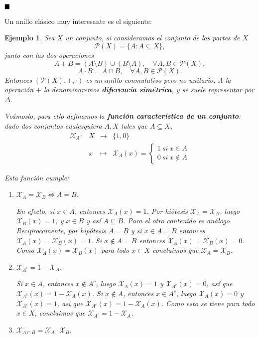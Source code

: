 \documentclass[12pt]{article}
\newtheorem{example}{Ejemplo}[theorem]
\begin{document}
$\hfill \blacksquare$

Un anillo clásico muy interesante es el siguiente:

\begin{example}Sea $X$ un conjunto, si consideramos el conjunto de las partes de $X$ $$\mathcal{P}(X) = \lbrace A : A \subseteq X \rbrace,$$ junto con las dos operaciones $$A+B = (A \setminus B) \cup (B \setminus A), \quad \forall A,B \in \mathcal{P}(X),$$ $$A \cdot B = A \cap B, \quad \forall A,B \in \mathcal{P}(X).$$ Entonces $(\mathcal{P}(X), +, \cdot)$ es un anillo conmutativo pero no unitario. A la operación $+$ la denominaremos \textbf{diferencia simétrica}, y se suele representar por $\Delta$.

Veámoslo, para ello definamos la \textbf{función característica de un conjunto}: dado dos conjuntos cualesquiera $A,X$ tales que $A \subseteq X$, 
$$\begin{array}{rccl}
\mathcal{X}_A \colon &X&\longrightarrow &\lbrace 1, 0\rbrace \\
&x& \longmapsto &\mathcal{X}_A(x) = \left\lbrace\begin{array}{c} 1~si~x \in A \\ 0~si~x \notin A \end{array}\right.
\end{array}
$$

Esta función cumple: 
\begin{enumerate}
\item $\mathcal{X}_A = \mathcal{X}_B \Leftrightarrow A = B$. 

En efecto, si $x \in A$, entonces $\mathcal{X}_A(x)=1$. Por hiótesis $\mathcal{X}_A=\mathcal{X}_B$, luego $\mathcal{X}_B(x)=1$, y $x \in B$ y así $A \subseteq B$. Para el otro contenido es análogo. Reciprocamente, por hipótesis $A = B$ y si $x \in A =B$ entonces $\mathcal{X}_A(x) = \mathcal{X}_B(x)=1$. Si $x \notin A = B$ entonces $\mathcal{X}_A(x) = \mathcal{X}_B(x) = 0$. Como $\mathcal{X}_A(x) = \mathcal{X}_B(x) $ para todo $x \in X$ concluimos que $\mathcal{X}_A = \mathcal{X}_B$.
\item $\mathcal{X}_{A^c} = 1- \mathcal{X}_A$.

Si $x \in A$, entonces $x \notin A^c$, luego $\mathcal{X}_A(x)=1$ y $\mathcal{X}_{A^c}(x)=0$, así que $\mathcal{X}_{A^c}(x) =1 - \mathcal{X}_A(x)$. Si $x \notin A$, entonces $x \in A^c$, luego $\mathcal{X}_A(x)=0$ y $\mathcal{X}_{A^c}(x)=1$, así que $\mathcal{X}_{A^c}(x) =1 - \mathcal{X}_A(x)$. Como esto se tiene para todo $x \in X$, concluimos que $\mathcal{X}_{A^c} = 1 - \mathcal{X}_A$.
\item $\mathcal{X}_{A \cap B} = \mathcal{X}_A \cdot \mathcal{X}_B$.


\end{enumerate}
\end{example}
\end{document}

